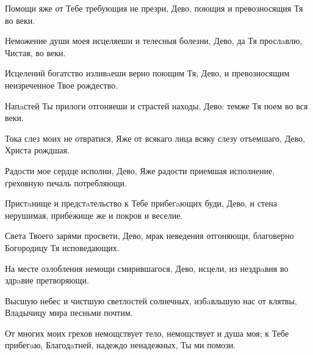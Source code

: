 \begin{mymulticols}


Помощи яже от Тебе требующия не презри, Дево, поющия и превозносящия Тя во веки.


Неможение души моея исцеляеши и телесныя болезни, Дево, да Тя прослaвлю, Чистая, во веки.

\slava

Исцелений богатство изливaеши верно поющим Тя, Дево, и превозносящим неизреченное Твое рождество.

\inyne

Напaстей Ты прилоги отгоняеши и страстей находы, Дево: темже Тя поем во вся веки.




Тока слез моих не отвратися, Яже от всякаго лица всяку слезу отъемшаго, Дево, Христа рождшая.


Радости мое сердце исполни, Дево, Яже радости приемшая исполнение, греховную печаль потребляющи.


Пристaнище и предстaтельство к Тебе прибегaющих буди, Дево, и стена нерушимая, прибежище же и покров и веселие.

\slava

Света Твоего зарями просвети, Дево, мрак неведения отгоняющи, благоверно Богородицу Тя исповедающих.

\inyne

На месте озлобления немощи смирившагося, Дево, исцели, из нездрaвия во здрaвие претворяющи.


Высшую небес и чистшую светлостей солнечных, избaвльшую нас от клятвы, Владычицу мира песньми почтим.

От многих моих грехов немощствует тело, немощствует и душа моя; к Тебе прибегaю, Благодaтней, надеждо ненадежных, Ты ми помози.


\end{mymulticols}
